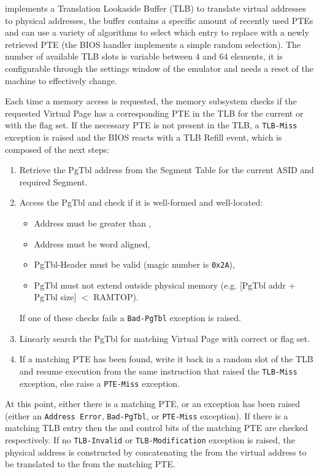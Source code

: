 \label{sec:man:tlb}

\uarm{} implements a Translation Lookaside Buffer (TLB) to translate virtual addresses to physical addresses, the buffer contains a specific amount of recently used PTEs and can use a variety of algorithms to select which entry to replace with a newly retrieved PTE (the BIOS handler implements a simple random selection).
The number of available TLB slots is variable between 4 and 64 elements, it is configurable through the settings window of the emulator and needs a reset of the machine to effectively change.

Each time a memory access is requested, the memory subsystem checks if the requested Virtual Page has a corresponding PTE in the TLB for the current  or with the  flag set.
If the necessary PTE is not present in the TLB, a \texttt{TLB-Miss} exception is raised and the BIOS reacts with a TLB Refill event, which is composed of the next steps:
\begin{enumerate}
\item Retrieve the PgTbl address from the Segment Table for the current ASID and required Segment.
\item Access the PgTbl and check if it is well-formed and well-located:
	\begin{itemize}
	\item Address must be greater than ,
	\item Address must be word aligned,
	\item PgTbl-Header must be valid (magic number is \texttt{0x2A}),
	\item PgTbl must not extend outside physical memory (e.g. [PgTbl addr + PgTbl size] $<$ RAMTOP).
	\end{itemize}
	If one of these checks fails a \texttt{Bad-PgTbl} exception is raised.
\item Linearly search the PgTbl for matching Virtual Page with correct  or  flag set.
\item If a matching PTE has been found, write it back in a random slot of the TLB and resume execution from the same instruction that raised the \texttt{TLB-Miss} exception, else raise a \texttt{PTE-Miss} exception.
\end{enumerate}

At this point, either there is a matching PTE, or an exception has been raised (either an \texttt{Address Error}, \texttt{Bad-PgTbl}, or \texttt{PTE-Miss} exception). 
If there is a matching TLB entry then the  and  control bits of the matching PTE are checked respectively. 
If no \texttt{TLB-Invalid} or \texttt{TLB-Modification} exception is raised, the physical address is constructed by concatenating the  from the virtual address to be translated to the  from the matching PTE.


